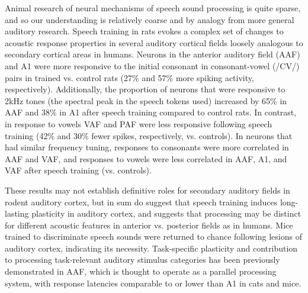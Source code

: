 Animal research of neural mechanisms of speech sound processing is quite sparse, and so our understanding is relatively coarse and by analogy from more general auditory research. Speech training in rats evokes a complex set of changes to acoustic response properties in several auditory cortical fields loosely analogous to secondary cortical areas in humans\cite{engineerSpeechTrainingAlters2015a}. Neurons in the anterior auditory field (AAF) and A1 were more responsive to the initial consonant in consonant-vowel (/CV/) pairs in trained vs. control rats (27\% and 57\% more spiking activity, respectively). Additionally, the proportion of neurons that were responsive to 2kHz tones (the spectral peak in the speech tokens used) increased by 65\% in AAF and 38\% in A1 after speech training compared to control rats. In contrast, in response to vowels VAF and PAF were less responsive following speech training (42\% and 30\% fewer spikes, respectively, vs. controls). In neurons that had similar frequency tuning, responses to consonants were more correlated in AAF and VAF, and responses to vowels were less correlated in AAF, A1, and VAF after speech training (vs. controls)\cite{engineerSpeechTrainingAlters2015a}. 

These results\cite{engineerSpeechTrainingAlters2015a} may not establish definitive roles for secondary auditory fields in rodent auditory cortex, but in sum do suggest that speech training induces long-lasting plasticity in auditory cortex, and suggests that processing may be distinct for different acoustic features in anterior vs. posterior fields as in humans. Mice trained to discriminate speech sounds were returned to chance following lesions of auditory cortex\cite{saundersMiceCanLearn2019}, indicating its necessity. Task-specific plasticity\cite{takahashiLearningstagedependentFieldspecificMap2011} and contribution to processing task-relevant auditory stimulus categories\cite{shiAnteriorAuditoryField2019} has been previously demonstrated in AAF, which is thought to operate as a parallel processing system, with response latencies comparable to or lower than A1 in cats\cite{carrascoNeuronalActivationTimes2011} and mice\cite{lindenSpectrotemporalStructureReceptive2003b}. 


